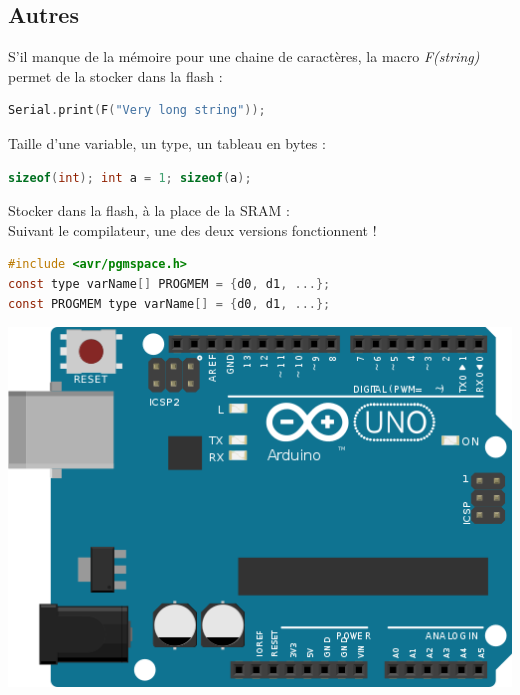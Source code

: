         \subsection{Autres}
            \bmar
                S'il manque de la mémoire pour une chaine de caractères, la macro \textit{F(string)} permet de la stocker dans la flash :
            \emar
            \begin{lstlisting}[language=C]
Serial.print(F("Very long string"));
            \end{lstlisting}
            \bmar
                Taille d'une variable, un type, un tableau en bytes :
            \emar
            \begin{lstlisting}[language=C]
sizeof(int); int a = 1; sizeof(a);
            \end{lstlisting}
            \bmar
                Stocker dans la flash, à la place de la SRAM :\\
                Suivant le compilateur, une des deux versions fonctionnent !
            \emar
            \begin{lstlisting}[language=C]
#include <avr/pgmspace.h>
const type varName[] PROGMEM = {d0, d1, ...};
const PROGMEM type varName[] = {d0, d1, ...};
            \end{lstlisting}

            \vspace{0.2cm}

            \begin{center}
                \includegraphics[scale=0.65]{img/arduino-uno-frietzing}
            \end{center}
    
